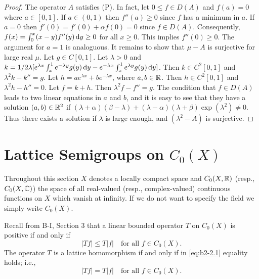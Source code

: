 \begin{proof}
The operator $A$ satisfies (P).
In fact, let $0 \leq f \in D(A)$ and $f(a) = 0$ where $a \in [0,1]$.
If $a \in (0,1)$ then $f''(a) \geq 0$ since $f$ has a minimum in $a$.
If $a = 0$ then $f'(0) = f'(0) + \alpha f(0) = 0$ since $f \in D(A)$.
Consequently, $f(x) = \int_{0}^{x} (x-y)f''(y) \mathop{}\!\mathrm{d}{y} \geq 0$ for all $x \geq 0$.
This implies $f''(0) \geq 0$.
The argument for $a = 1$ is analoguous.
It remains to show that $\mu - A$ is surjective for large real $\mu$.
Let $g \in C[0,1]$.
Let $\lambda > 0$ and 
$k = 1/2\lambda[e^{\lambda x}\int_{x}^{1} e^{-\lambda y}g(y)\mathop{}\!\mathrm{d}{y} - e^{-\lambda x}\int_{
x}^{1} e^{\lambda y}g(y)\mathop{}\!\mathrm{d}{y}]$.
Then $k \in C^{2}[0,1]$ and $\lambda^{2}k - k'' = g$.
Let $h = ae^{\lambda x} + be^{-\lambda x}$, where $a,b \in \mathbb{R}$.
Then $h \in C^{2}[0,1]$ and $\lambda^{2}h - h'' = 0$.
Let $f = k + h$.
Then $\lambda^{2}f - f'' = g$.
The condition that $f \in D(A)$ leads to two linear equations in $a$ and $b$, and it is easy to see that they have a solution $(a,b) \in \mathbb{R}^{2}$ if $(\lambda+\alpha)(\beta-\lambda) + (\lambda-\alpha)(\lambda+\beta)\exp(\lambda^{2}) \neq 0$.
Thus there exists a solution if $\lambda$ is large enough, and $(\lambda^{2} - A)$ is surjective.
\end{proof}

\section{Lattice Semigroups on  \texorpdfstring{$C_{0}(X)$}{C(X)}}\label{sec:b2-2}

Throughout this section $X$ denotes a locally compact space and $C_{0}(X,\mathbb{R})$ (resp., $C_{0}(X,\mathbb{C})$) the space of all real-valued (resp., complex-valued) continuous functions on $X$ which vanish at infinity.
If we do not want to specify the field we simply write $C_{0}(X)$.

Recall from B-I, Section 3 that a linear bounded operator $T$ on $C_{0}(X)$ is positive if and only if
\begin{equation}\label{eq:b2-2.1}
|Tf| \leq T|f| \quad \text{for all } f \in C_{0}(X).
\end{equation}
The operator $T$ is a lattice homomorphism if and only if in \eqref{eq:b2-2.1} equality holds; i.e.,
\begin{equation}\label{eq:b2-2.2}
|Tf| = T|f| \quad \text{for all } f \in C_{0}(X).
\end{equation}

